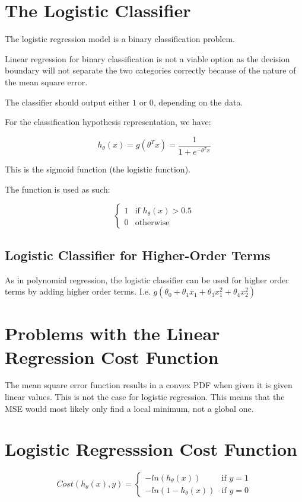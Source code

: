 \section{The Logistic Classifier}
The logistic regression model is a binary classification problem.

Linear regression for binary classification is not a viable option as the decision boundary will not separate the two categories correctly because of the nature of the mean square error.

The classifier should output either $1$ or $0$, depending on the data.

For the classification hypothesis representation, we have:

\[
    h_\theta(x) = g(\theta^Tx) = \frac{1}{1+e^{-\theta^Tx}}
\]
\bigskip

This is the sigmoid function (the logistic function).

The function is used as such:

\begin{equation}
    \left\{\begin{matrix}
        1 & \text{if } h_\theta(x) > 0.5 \\ 
        0 & \text{otherwise}
        \end{matrix}\right.
\end{equation}

\subsection{Logistic Classifier for Higher-Order Terms}
As in polynomial regression, the logistic classifier can be used for higher order terms by adding higher order terms. I.e. $g(\theta_0 + \theta_1x_1+\theta_3x_1^2+\theta_4x_2^2)$

\section{Problems with the Linear Regression Cost Function}
The mean square error function results in a convex PDF when given it is given linear values. This is not the case for logistic regression. This means that the MSE would most likely only find a local minimum, not a global one.

\section{Logistic Regresssion Cost Function}
\begin{equation}
    Cost(h_\theta(x), y) = 
    \left\{\begin{matrix}
        -ln(h_\theta(x)) & \text{if } y=1 \\ 
        -ln(1-h_\theta(x)) & \text{if } y=0
        \end{matrix}\right.
\end{equation}

